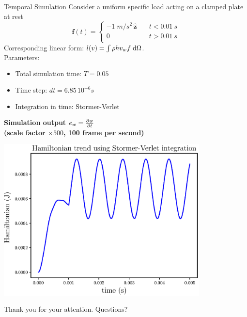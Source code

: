 \documentclass{beamer}
\begin{document}
\begin{frame}{Temporal Simulation}
Consider a uniform specific load acting on a clamped plate at rest
\begin{equation*}
\bm{f}(t) = 
\begin{cases}
-1  \; m/s^2 \, \hat{\bm{z}} \quad &t < 0.01 \ s \\
0 			\quad &t > 0.01 \ s\\
\end{cases}
\end{equation*}
Corresponding linear form: $l(v) = \int \rho h v_w f \d{\Omega}$. \\
Parameters:
\begin{itemize}
\item Total simulation time: $ T = 0.05$
\item Time step: $dt= 6.85 \, 10^{-6} s $ 
\item Integration in time: Stormer-Verlet
\end{itemize}

\end{frame}

\begin{frame}
\centering
\textbf{Simulation output $e_w = \diffp{w}{t}$ \\ (scale factor $\times 500$, 100 frame per second)}

\vspace{0.5cm}



\end{frame}

\begin{frame}
\centering
\includegraphics[width=0.8\textwidth]{Ham_MinLoaded.eps}
\end{frame}

\begin{frame}[allowframebreaks]

\nocite{*}



\end{frame}

\begin{frame}
\centering
Thank you for your attention. Questions?
\end{frame}
\end{document}
